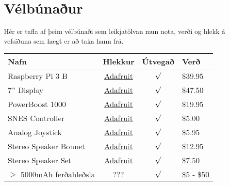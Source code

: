 \section{Vélbúnaður}
Hér er tafla af þeim vélbúnaði sem leikjatölvan mun nota, verði og hlekk á vefsíðuna sem hægt er að taka hann frá.
\renewcommand{\arraystretch}{1.5}
\setlength{\tabcolsep}{1.0em}

\begin{tabular}{l c c l}
    \textbf{Nafn} & \textbf{Hlekkur} & \textbf{Útvegað} & \textbf{Verð} \\
    \hline
    Raspberry Pi 3 B & \href{https://www.adafruit.com/products/3055}{Adafruit} & $\surd $& \$39.95\\
    \hline
    7'' Display & \href{https://www.adafruit.com/products/2354}{Adafruit} & $\surd $& \$47.50\\
    \hline
    PowerBoost 1000 & \href{https://www.adafruit.com/products/2465}{Adafruit} & $\surd $& \$19.95 \\
    \hline
    SNES Controller & \href{https://www.adafruit.com/products/131}{Adafruit} & $\surd $& \$5.00 \\
    \hline
    Analog Joystick & \href{https://www.adafruit.com/products/512}{Adafruit} & $\surd $& \$5.95 \\
    \hline
    Stereo Speaker Bonnet & \href{https://www.adafruit.com/products/3346}{Adafruit} & $\surd $& \$12.95 \\
    \hline
    Stereo Speaker Set & \href{https://www.adafruit.com/products/1669}{Adafruit} & $\surd $& \$7.50\\
    \hline
    $\geq$ 5000mAh ferðahleðsla & ??? & $\surd $ & \$5 - \$50 \\
\end{tabular}
